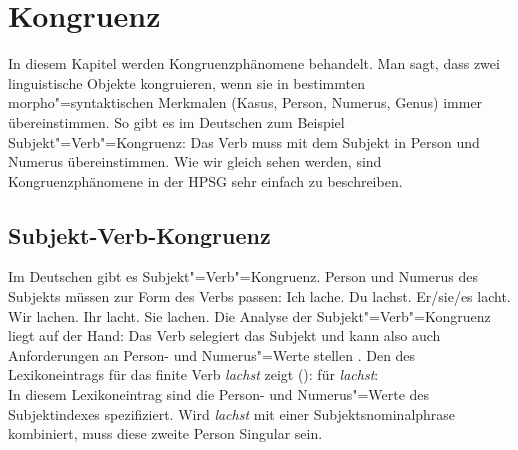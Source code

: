 

\chapter{Kongruenz}
\label{chap-kongruenz}

In diesem Kapitel werden Kongruenzphänomene behandelt. Man sagt, dass zwei linguistische
Objekte kongruieren, wenn sie in bestimmten morpho"=syntaktischen Merkmalen (\zb Kasus,
Person, Numerus, Genus) immer übereinstimmen.
So gibt es im Deutschen zum Beispiel Subjekt"=Verb"=Kongruenz: 
Das Verb muss mit dem Subjekt in Person und Numerus übereinstimmen.
Wie wir gleich sehen werden, sind Kongruenzphänomene in der HPSG sehr einfach
zu beschreiben.

\section{Subjekt-Verb-Kongruenz}

Im Deutschen gibt es Subjekt"=Verb"=Kongruenz. Person und Numerus des Subjekts
müssen zur Form des Verbs passen:
\eal
\ex Ich lache.
\ex Du lachst.
\ex Er/sie/es lacht.
\ex Wir lachen.
\ex Ihr lacht.
\ex Sie lachen.
\zl
Die Analyse der Subjekt"=Verb"=Kongruenz liegt auf der Hand: Das Verb selegiert
das Subjekt und kann also auch Anforderungen an Person- und Numerus"=Werte stellen \citep[]{ps2}.
Den \localw des Lexikoneintrags für das finite Verb \emph{lachst} zeigt ():
\ea
\localw für \emph{lachst}:\\
\z
In diesem Lexikoneintrag sind die Person- und Numerus"=Werte des Subjektindexes 
spezifiziert. Wird \emph{lachst} mit einer Subjektsnominalphrase kombiniert, muss diese zweite Person Singular
sein.

